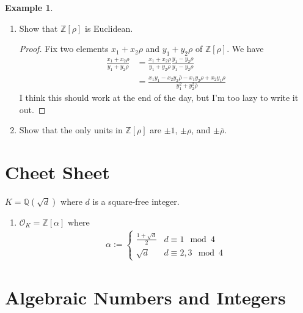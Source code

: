 \documentclass[a4paper]{book}
\theoremstyle{definition}
\newtheorem{example}{Example}[definition]
\begin{document}
\begin{example}
    \begin{enumerate}
        \item Show that \(\mathbb{Z}[\rho]\) is Euclidean.
        \begin{proof}
            Fix two elements \(x_1 + x_2 \rho\) and \(y_1 + y_2 \rho\) of \(\mathbb{Z}[\rho]\). We have
            \begin{align*}
                \frac{x_1 + x_2 \rho}{y_1 + y_2 \rho} &= \frac{x_1 + x_2 \rho}{y_1 + y_2 \rho} \frac{y_1 - y_2 \rho}{y_1 - y_2 \rho} \\
                &= \frac{x_1 y_1 - x_2 y_2 \overline{\rho}  - x_1 y_2 \rho + x_2 y_1 \rho}{y_1^2 + y_2^2 \overline{\rho}}
            \end{align*}
            I think this should work at the end of the day, but I'm too lazy to write it out.
        \end{proof}
        \item Show that the only units in \(\mathbb{Z}[\rho]\) are \(\pm 1\), \(\pm \rho\), and \(\pm \overline{\rho}\).
    \end{enumerate}
\end{example}

\chapter{Cheet Sheet}

\noindent \(K = \mathbb{Q}(\sqrt{d})\) where \(d\) is a square-free integer.
\begin{enumerate}
    \item \(\mathcal{O}_K = \mathbb{Z}[\alpha]\) where
    \begin{align*}
        \alpha := \begin{cases}
            \frac{1 + \sqrt{d}}{2} & d \equiv 1 \mod{4} \\
            \sqrt{d} & d \equiv 2, 3 \mod{4}
        \end{cases}
    \end{align*}
\end{enumerate}

\chapter{Algebraic Numbers and Integers}
\end{document}
